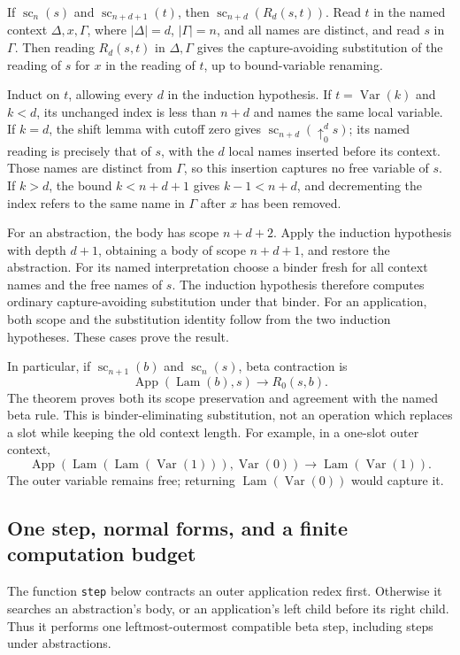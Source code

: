 \begin{theorem}
\label{thm:debruijn_replacement}
If $\operatorname{sc}_n(s)$ and $\operatorname{sc}_{n+d+1}(t)$, then
$\operatorname{sc}_{n+d}(R_d(s,t))$.
Read $t$ in the named context $\Delta,x,\Gamma$, where
$|\Delta|=d$, $|\Gamma|=n$, and all names are distinct, and read $s$
in $\Gamma$. Then reading $R_d(s,t)$ in $\Delta,\Gamma$ gives the
capture-avoiding substitution of the reading of $s$ for $x$ in the
reading of $t$, up to bound-variable renaming.
\end{theorem}
\Proof
Induct on $t$, allowing every $d$ in the induction hypothesis.
If $t=\operatorname{Var}(k)$ and $k<d$, its unchanged index is less
than $n+d$ and names the same local variable. If $k=d$, the shift
lemma with cutoff zero gives
$\operatorname{sc}_{n+d}(\uparrow^d_0s)$; its named reading is precisely
that of $s$, with the $d$ local names inserted before its context.
Those names are distinct from $\Gamma$, so this insertion captures no
free variable of $s$. If $k>d$, the bound $k<n+d+1$ gives
$k-1<n+d$, and decrementing the index refers to the same name in
$\Gamma$ after $x$ has been removed.

For an abstraction, the body has scope $n+d+2$. Apply the induction
hypothesis with depth $d+1$, obtaining a body of scope $n+d+1$,
and restore the abstraction. For its named interpretation choose a
binder fresh for all context names and the free names of $s$.
The induction hypothesis therefore computes ordinary capture-avoiding
substitution under that binder. For an application, both scope and
the substitution identity follow from the two induction hypotheses.
These cases prove the result.
\Done

In particular, if $\operatorname{sc}_{n+1}(b)$ and
$\operatorname{sc}_n(s)$, beta contraction is
\[
\operatorname{App}(\operatorname{Lam}(b),s)
\longrightarrow R_0(s,b).
\]
The theorem proves both its scope preservation and agreement with the
named beta rule. This is binder-eliminating substitution, not an
operation which replaces a slot while keeping the old context length.
For example, in a one-slot outer context,
\[
\operatorname{App}(\operatorname{Lam}(\operatorname{Lam}(\operatorname{Var}(1))),
                   \operatorname{Var}(0))
\longrightarrow\operatorname{Lam}(\operatorname{Var}(1)).
\]
The outer variable remains free; returning
$\operatorname{Lam}(\operatorname{Var}(0))$ would capture it.

\subsection{One step, normal forms, and a finite computation budget}
The function \texttt{step} below contracts an outer application redex
first. Otherwise it searches an abstraction's body, or an application's
left child before its right child. Thus it performs one leftmost-outermost
compatible beta step, including steps under abstractions.

